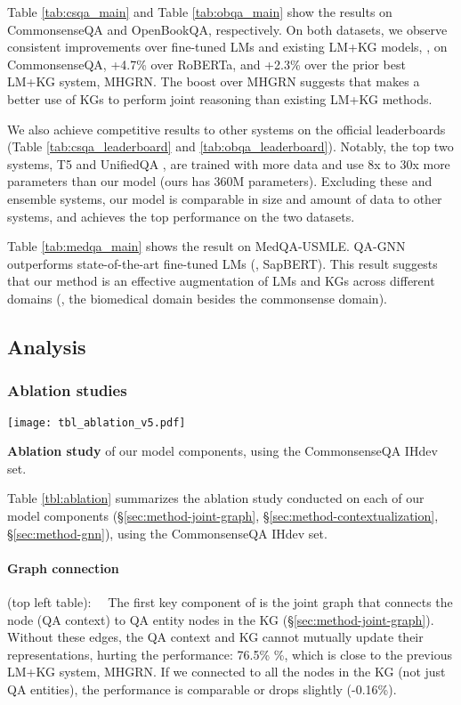 Table \ref{tab:csqa_main} and Table \ref{tab:obqa_main} show the results on CommonsenseQA and OpenBookQA, respectively. On both datasets, we observe consistent improvements over fine-tuned LMs and existing LM+KG models, \eg, on CommonsenseQA, +4.7\% over RoBERTa, and +2.3\% over the prior best LM+KG system, MHGRN. 
The boost over MHGRN suggests that \methodname makes a better use of KGs to perform joint reasoning than existing LM+KG methods.

We also achieve competitive results to other systems on the official leaderboards (Table  \ref{tab:csqa_leaderboard} and \ref{tab:obqa_leaderboard}). Notably, the top two systems, T5 \cite{t5} and UnifiedQA \cite{khashabi2020unifiedqa}, are trained with more data and use 8x to 30x more parameters than our model (ours has 360M parameters).
Excluding these and ensemble systems, our model is comparable in size and amount of data to other systems, and achieves the top performance on the two datasets.


Table \ref{tab:medqa_main} shows the result on MedQA-USMLE. QA-GNN outperforms state-of-the-art fine-tuned LMs (\eg, SapBERT). This result suggests that our method is an effective augmentation of LMs and KGs across different domains (\ie, the biomedical domain besides the commonsense domain).



\subsection{Analysis}
\subsubsection{Ablation studies}
\label{sec:experiment-ablation}
\begin{table}[!t]
\hspace{-2mm}
\texttt{[image: tbl\_ablation\_v5.pdf]}
    \vspace{-7mm}
    \caption{\textbf{Ablation study} of our model components, using the CommonsenseQA IHdev set.}
\label{tbl:ablation}
\end{table}

Table \ref{tbl:ablation} summarizes the ablation study conducted on each of our model components (\S \ref{sec:method-joint-graph}, \S \ref{sec:method-contextualization}, \S \ref{sec:method-gnn}), using the CommonsenseQA IHdev set.

\paragraph{Graph connection}\!\!\!\!(top left table):~~ The first key component of \methodname is the joint graph that connects the  node (QA context) to QA entity nodes  in the KG (\S \ref{sec:method-joint-graph}). Without these edges, the QA context and KG cannot mutually update their representations, hurting the performance: 76.5\% \!\%, which is close to the previous LM+KG system, MHGRN. 
If we connected  to all the nodes in the KG (not just QA entities), the performance is comparable or drops slightly (-0.16\%).


